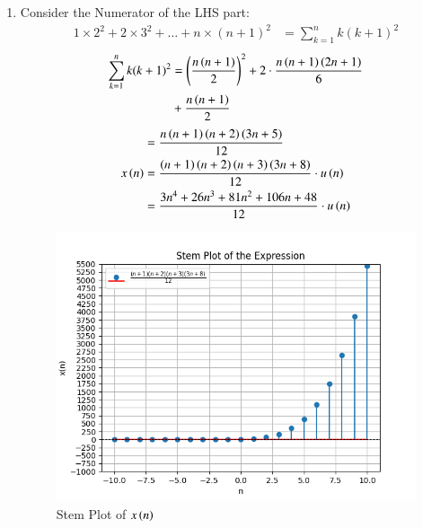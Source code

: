 \documentclass[journal,12pt,twocolumn]{IEEEtran}
\theoremstyle{remark}
\begin{document}
\begin{enumerate}[label=\arabic*.]
\item Consider the Numerator of the LHS part:
\begin{align}
    1\times2^2 + 2\times3^2 + \dots + n\times(n+1)^2 &= \sum_{k=1}^n k(k+1)^2 
\end{align}
\begin{align}
                       \sum_{k=1}^n k(k+1)^2    &= \left(\frac{n\left(n+1\right)}{2}\right)^{\scriptstyle 2} + 2\cdot \frac{n\left(n+1\right)\left(2n+1\right)}{6}\\ &+\frac{n\left(n+1\right)}{2}\notag 
\end{align}
\begin{align}
                          &= \frac{n\left(n+1\right)\left(n+2\right)\left(3n+5\right)}{12}\\
    x\left(n\right) &=  \frac{\left(n+1\right)\left(n+2\right)\left(n+3\right)\left(3n+8\right)}{12}\cdot u\left(n\right)\\
         &= \frac{3n^4 + 26n^3 + 81n^2 + 106n + 48}{12}\cdot u\left(n\right) \label{eq:11.9.5.26.1}
\end{align}
\begin{figure}[h]
    \hspace{1cm}
    \includegraphics[width=1\columnwidth]{Figure_1.png}
    \caption{Stem Plot of $x\left(n\right)$}
\end{figure}


\end{enumerate}
\end{document}
